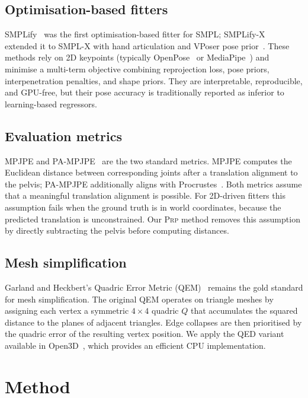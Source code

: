 \documentclass[twocolumn,10pt]{svjour3}
\newcommand{\prp}{\textsc{Prp}}
\begin{document}
\subsection{Optimisation-based fitters}
SMPLify~\cite{SMPLify} was the first optimisation-based fitter for SMPL; SMPLify-X~\cite{SMPLifyX} extended it to SMPL-X with hand articulation and VPoser pose prior~\cite{VPoser}. These methods rely on 2D keypoints (typically OpenPose~\cite{OpenPose} or MediaPipe~\cite{Mediapipe}) and minimise a multi-term objective combining reprojection loss, pose priors, interpenetration penalties, and shape priors. They are interpretable, reproducible, and GPU-free, but their pose accuracy is traditionally reported as inferior to learning-based regressors.

\subsection{Evaluation metrics}
MPJPE and PA-MPJPE~\cite{PAMpjpe} are the two standard metrics. MPJPE computes the Euclidean distance between corresponding joints after a translation alignment to the pelvis; PA-MPJPE additionally aligns with Procrustes~\cite{Procrustes}. Both metrics assume that a meaningful translation alignment is possible. For 2D-driven fitters this assumption fails when the ground truth is in world coordinates, because the predicted translation is unconstrained. Our \prp{} method removes this assumption by directly subtracting the pelvis before computing distances.

\subsection{Mesh simplification}
Garland and Heckbert's Quadric Error Metric (QEM)~\cite{QED} remains the gold standard for mesh simplification. The original QEM operates on triangle meshes by assigning each vertex a symmetric $4\times4$ quadric $Q$ that accumulates the squared distance to the planes of adjacent triangles. Edge collapses are then prioritised by the quadric error of the resulting vertex position. We apply the QED variant available in Open3D~\cite{Open3D}, which provides an efficient CPU implementation.

\section{Method}
\label{sec:method}
\end{document}

